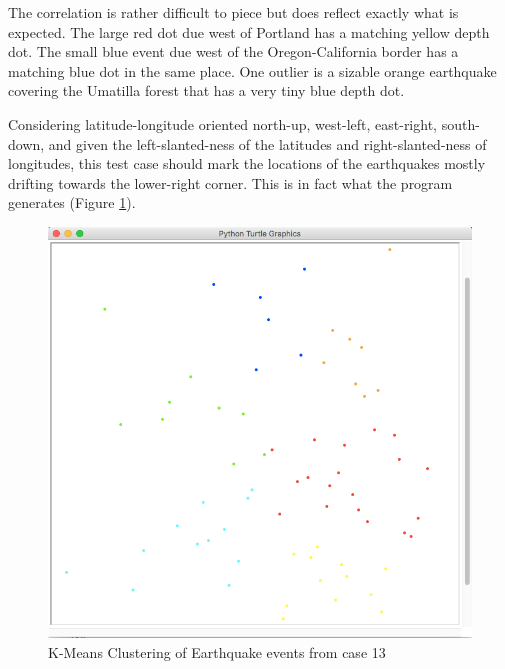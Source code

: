 The correlation is rather difficult to piece but does reflect exactly what is expected. The large red dot due west of Portland has a matching yellow depth dot. The small blue event due west of the Oregon-California border has a matching blue dot in the same place. One outlier is a sizable orange earthquake covering the Umatilla forest that has a very tiny blue depth dot.

Considering latitude-longitude oriented north-up, west-left, east-right, south-down, and given the left-slanted-ness of the latitudes and right-slanted-ness of longitudes, this test case should mark the locations of the earthquakes mostly drifting towards the lower-right corner. This is in fact what the program generates (Figure \ref{fig:clusters}).

\begin{figure}
\centering
\includegraphics[scale=0.5]{clusters-nobg.png}
\caption{K-Means Clustering of Earthquake events from case 13}
\label{fig:clusters}
\end{figure}